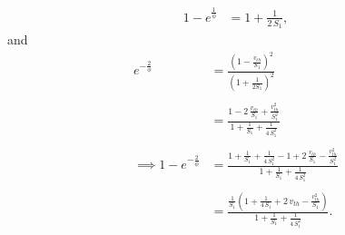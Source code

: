 \begin{enumerate}
\begin{align*}
{{	}
}
{
	1 - e^
	{
		\frac
		{
			1
		}
		{
			\phi
		}
	}
}
&= 
1 + 
\frac
{
	1
}
{
	2 \, S_1
},
\end{align*}
and 
\begin{align*}
	e^
	{
		-
		\frac
		{
			2
		}
		{
			\phi
		}
	}
	&= 
	\frac
	{
		\left(
			1 - \frac
			{
				v_{th}
			}
			{
				S_1
			}
		\right)^2
	}
	{
		\left(
			1 + \frac
			{
				1
			}
			{
				2 S_1
			}
		\right)^2
	}
	\\
	\\
	&= 
	\frac
	{
		1 
		-
		2 \, \frac
		{
			v_{th}		
		}
		{
			S_1
		}
		+
		\frac
		{
			v_{th}^2
		}
		{
			S_1^2
		}
	}
	{
		1 + 
		\frac
		{
			1	
		}
		{
			S_1
		}
		+
		\frac
		{
			1
		}
		{
			4 \, S_1^2
		}	
	}
	\\
	\\
	\implies
	1 - e^
	{
		-\frac
		{
			2
		}
		{
			\phi
		}
	}
	&= 
	\frac
	{
			1 + 
		\frac
		{
			1	
		}
		{
			S_1
		}
		+
		\frac
		{
			1
		}
		{
			4 \, S_1^2
		}
		- 1
		+ 2 \, 
		\frac
		{
			v_{th}
		}
		{
			S_1
		}	
		-\frac
		{
			v_{th}^2
		}
		{
			S_1^2
		}
	}
	{
			1 + 
		\frac
		{
			1	
		}
		{
			S_1
		}
		+
		\frac
		{
			1
		}
		{
			4 \, S_1^2
		}	
	}
	\\
	\\
	&=
	\frac
	{
		\frac
		{
			1
		}
		{
			S_1
		} 
		\left(
			1 + 
			\frac
			{
				1
			}
			{
				4 \, S_1
			}
			+ 
			2\, v_{th}
			-
			\frac
			{
				v_{th}^2
			}
			{
				S_1
			}
		\right)
	}
	{
		1 + 
		\frac
		{
			1	
		}
		{
			S_1
		}
		+
		\frac
		{
			1
		}
		{
			4 \, S_1^2
		}		
	}.
\end{align*}


\end{enumerate}
